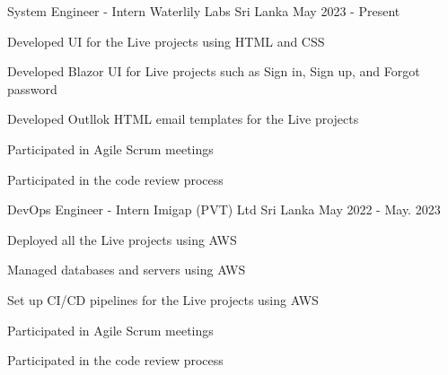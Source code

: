

\begin{cventries}

  \cventry
  {System Engineer - Intern} %
  {Waterlily Labs} %
  {Sri Lanka} %
  {May 2023 - Present} %
  {
    \begin{cvitems} %
      \item {Developed UI for the Live projects using HTML and CSS}
      \item {Developed Blazor UI for Live projects such as Sign in, Sign up, and Forgot password}
      \item {Developed Outllok HTML email templates for the Live projects}
      \item {Participated in Agile Scrum meetings}
      \item {Participated in the code review process}
    \end{cvitems}
  }

  \cventry
  {DevOps Engineer - Intern} %
  {Imigap (PVT) Ltd} %
  {Sri Lanka} %
  {May 2022 - May. 2023} %
  {
    \begin{cvitems} %
      \item {Deployed all the Live projects using AWS}
      \item {Managed databases and servers using AWS}
      \item {Set up CI/CD pipelines for the Live projects using AWS}
      \item {Participated in Agile Scrum meetings}
      \item {Participated in the code review process}
    \end{cvitems}
  }




\end{cventries}
